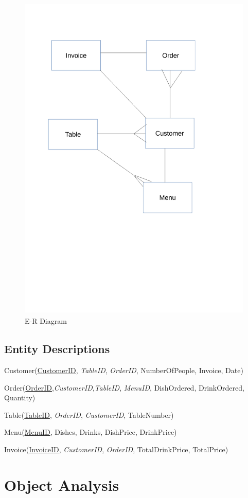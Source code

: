 \begin{figure}[H]
    \includegraphics[height = 16cm]{./Analysis/ERDiagram}
    \caption{E-R Diagram} \label{fig:ERD}
\end{figure}

\subsection{Entity Descriptions}

Customer(\underline{CustomerID}, \textit{TableID}, \textit{OrderID}, NumberOfPeople, Invoice, Date)

Order(\underline{OrderID},\textit{CustomerID},\textit{TableID}, \textit{MenuID}, DishOrdered, DrinkOrdered, Quantity)

Table(\underline{TableID}, \textit{OrderID}, \textit{CustomerID}, TableNumber) 

Menu(\underline{MenuID}, Dishes, Drinks, DishPrice, DrinkPrice)

Invoice(\underline{InvoiceID}, \textit{CustomerID}, \textit{OrderID}, TotalDrinkPrice, TotalPrice)


\section{Object Analysis}

